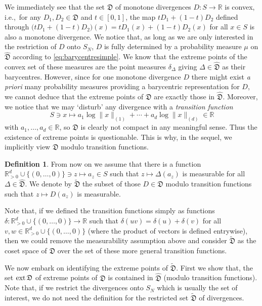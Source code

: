 \documentclass[12pt,a4paper,reqno]{amsart}
\theoremstyle{definition}
\newtheorem{definition}[proposition]{Definition}
\newcommand{\mf}[1]{\mathfrak{#1}}
\newcommand{\R}{\mathbb R}
\begin{document}
We immediately see that the set $\mf D$ of monotone divergences $D:S\to\R$ is convex, i.e.,\ for any $D_1,D_2\in\mf D$ and $t\in[0,1]$, the map $tD_1+(1-t)D_2$ defined through $\big(tD_1+(1-t)D_2\big)(x)=tD_1(x)+(1-t)D_2(x)$ for all $x\in S$ is also a monotone divergence. We notice that, as long as we are only interested in the restriction of $D$ onto $S_N$, $D$ is fully determined by a probability measure $\mu$ on $\hat{\mf D}$ according to \eqref{eq:barycentresimple}. We know that the extreme points of the convex set of these measures are the point measures $\delta_\Delta$ giving $\Delta\in\hat{\mf D}$ as their barycentres. However, since for one monotone divergence $D$ there might exist {\it a priori} many probability measures providing a barycentric representation for $D$, we cannot deduce that the extreme points of $\mf D$ are exactly those in $\hat{\mf D}$. Moreover, we notice that we may `disturb' any divergence with a {\it transition function}
$$
S\ni x\mapsto a_1\log{\|x\|_{(1)}}+\cdots+a_d\log{\|x\|_{(d)}}\in\R
$$
with $a_1,\ldots,a_d\in\R$, so $\mf D$ is clearly not compact in any meaningful sense. Thus the existence of extreme points is questionable. This is why, in the sequel, we implicitly view $\mf D$ modulo transition functions.

\begin{definition}
From now on we assume that there is a function $\R_{>0}^d\cup\{(0,\ldots,0)\}\ni z\mapsto a_z\in S$ such that $z\mapsto\Delta(a_z)$ is measurable for all $\Delta\in\hat{\mf D}$. We denote by $\tilde{\mf D}$ the subset of those $D\in\mf D$ modulo transition functions such that $z\mapsto D(a_z)$ is measurable.
\end{definition}

Note that, if we defined the transition functions simply as functions $\delta:\R_{>0}^d\cup\{(0,\ldots,0)\}\to\R$ such that $\delta(uv)=\delta(u)+\delta(v)$ for all $v,w\in\R_{>0}^d\cup\{(0,\ldots,0)\}$ (where the product of vectors is defined entrywise), then we could remove the measurability assumption above and consider $\tilde{\mf D}$ as the coset space of $\mf D$ over the set of these more general transition functions.

We now embark on identifying the extreme points of $\tilde{\mf D}$. First we show that, the set ${\rm ext}\,\mf D$ of extreme points of $\mf D$ is contained in $\hat{\mf D}$ (modulo transition functions). Note that, if we restrict the divergences onto $S_N$ which is usually the set of interest, we do not need the definition for the restricted set $\tilde{\mf D}$ of divergences.
\end{document}
